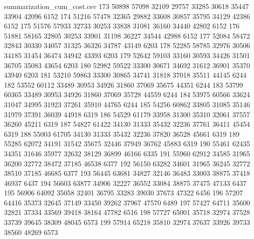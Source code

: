 \begin{filecontents*}{summarization_cum_cost.csv}
173	50898	57098	32109	29757	33285	30618	35447	33904	42096	6152
174	51216	57478	32365	29882	33608	30857	35795	34129	42386	6152
175	51576	57933	32733	30253	33838	31081	36160	34440	42802	6152
176	51881	58165	32805	30253	33901	31198	36227	34544	42988	6152
177	52084	58472	32843	30330	34057	31325	36326	34787	43149	6203
178	52285	58785	32976	30506	34185	31454	36474	34942	43393	6203
179	52642	59103	33160	30593	34426	31501	36705	35083	43654	6203
180	52982	59522	33300	30671	34692	31612	36901	35370	43940	6203
181	53210	59863	33300	30865	34741	31818	37018	35511	44145	6244
182	53552	60112	33489	30953	34926	31860	37069	35675	44351	6244
183	53799	60365	33489	30953	34926	31860	37069	35728	44559	6244
184	53975	60566	33624	31047	34995	31923	37261	35910	44765	6244
185	54256	60862	33805	31085	35146	31979	37391	36039	44918	6319
186	54529	61179	33958	31300	35310	32061	37557	36260	45211	6319
187	54827	61422	34130	31333	35432	32236	37761	36411	45454	6319
188	55003	61705	34130	31333	35432	32236	37820	36528	45661	6319
189	55285	62072	34191	31542	35675	32446	37949	36762	45883	6319
190	55461	62435	34351	31646	35977	32632	38129	36899	46166	6335
191	55960	62912	34585	31965	36200	32772	38472	37185	46538	6377
192	56150	63282	34601	31965	36245	32772	38510	37185	46685	6377
193	56445	63681	34827	32146	36483	33003	38875	37418	46937	6437
194	56603	63877	34906	32227	36552	33084	38875	37475	47133	6437
195	56906	64092	35058	32401	36795	33283	39030	37673	47322	6456
196	57207	64416	35373	32645	37149	33450	39262	37967	47570	6489
197	57427	64711	35600	32821	37334	33569	39418	38164	47782	6516
198	57727	65001	35718	32974	37528	33739	39645	38309	48045	6573
199	57914	65218	35810	32974	37637	33926	39733	38560	48269	6573
\end{filecontents*}


